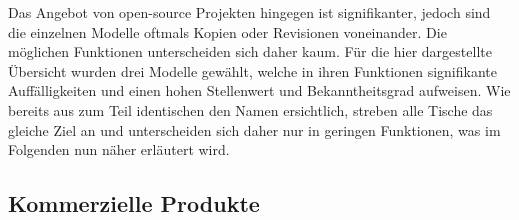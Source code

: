Das Angebot von open-source Projekten hingegen ist signifikanter, jedoch
sind die einzelnen Modelle oftmals Kopien oder Revisionen voneinander.
Die möglichen Funktionen unterscheiden sich daher kaum. Für die hier
dargestellte Übersicht wurden drei Modelle gewählt, welche in ihren
Funktionen signifikante Auffälligkeiten und einen hohen Stellenwert und
Bekanntheitsgrad aufweisen. Wie bereits aus zum Teil identischen den
Namen ersichtlich, streben alle Tische das gleiche Ziel an und
unterscheiden sich daher nur in geringen Funktionen, was im Folgenden
nun näher erläutert wird.

\hypertarget{kommerzielle-produkte}{%
\subsection{Kommerzielle Produkte}\label{kommerzielle-produkte}}

